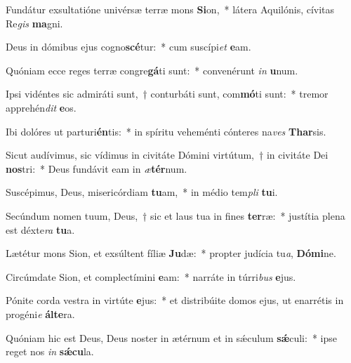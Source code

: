 \item Fundátur exsultatióne univérsæ terræ mons \textbf{Si}on,~* látera Aquilónis, cívitas Re\textit{gis} \textbf{ma}gni.
\item Deus in dómibus ejus cogno\textbf{scé}tur:~* cum suscípi\textit{et} \textbf{e}am.
\item Quóniam ecce reges terræ congre\textbf{gá}ti sunt:~* convenérunt \textit{in} \textbf{u}num.
\item Ipsi vidéntes sic admiráti sunt,~† conturbáti sunt, com\textbf{mó}ti sunt:~* tremor apprehén\textit{dit} \textbf{e}os.
\item Ibi dolóres ut parturi\textbf{én}tis:~* in spíritu veheménti cónteres na\textit{ves} \textbf{Thar}sis.
\item Sicut audívimus, sic vídimus in civitáte Dómini virtútum,~† in civitáte Dei \textbf{nos}tri:~* Deus fundávit eam in \textit{æ}\textbf{tér}num.
\item Suscépimus, Deus, misericórdiam \textbf{tu}am,~* in médio tem\textit{pli} \textbf{tu}i.
\item Secúndum nomen tuum, Deus,~† sic et laus tua in fines \textbf{ter}ræ:~* justítia plena est déxte\textit{ra} \textbf{tu}a.
\item Lætétur mons Sion, et exsúltent fíliæ \textbf{Ju}dæ:~* propter judícia tu\textit{a}, \textbf{Dó}\textbf{mi}ne.
\item Circúmdate Sion, et complectímini \textbf{e}am:~* narráte in túrri\textit{bus} \textbf{e}jus.
\item Pónite corda vestra in virtúte \textbf{e}jus:~* et distribúite domos ejus, ut enarrétis in progéni\textit{e} \textbf{ál}\textbf{te}ra.
\item Quóniam hic est Deus, Deus noster in ætérnum et in sǽculum \textbf{sǽ}culi:~* ipse reget nos \textit{in} \textbf{sǽ}\textbf{cu}la.
